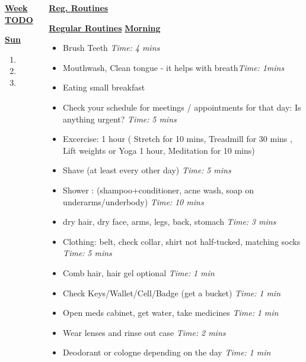 \documentclass[serif,mathserif,final]{beamer}
\newcommand{\timeEst}[1]{\textit{Time:} \textit{#1}}
\begin{document}
\begin{frame}{}
\begin{columns}[t]
\begin{column}{0.33\linewidth}{\textbf{\underline{Week TODO}}}
\begin{block}
\begin{enumerate}
\end{enumerate} 


\textbf{\underline{Sun}}

\begin{enumerate} 
\tiny \item \tiny 
\item \tiny 
\item \tiny 
\end{enumerate} 

\end{block} 

\end{column}%

\begin{column}{0.27\linewidth} {\textbf{\underline{Reg. Routines}}} 

\begin{block}{\small \textbf{\underline{Regular Routines}} }
\underline{\textbf{Morning}}
\begin{itemize}
\item \tiny Brush Teeth \timeEst{4 mins}
\item \tiny Mouthwash, Clean tongue - it helps with breath\timeEst{1mins} 
\item \tiny Eating small breakfast
\item \tiny Check your schedule for meetings / appointments for that day: Is anything urgent? \timeEst{5 mins}
\item \tiny Excercise: 1 hour ( Stretch for 10 mins, Treadmill for 30 mins , Lift weights or Yoga 1 hour, Meditation for 10 mins)
\item \tiny Shave (at least every other day) \timeEst{5 mins}
\item \tiny Shower : (shampoo+conditioner, acne wash,  soap on underarms/underbody)
\timeEst{10 mins}
\item \tiny dry hair, dry face, arms, legs, back, stomach \timeEst{3 mins}
\item \tiny Clothing: belt, check collar, shirt not half-tucked, matching socks \timeEst{5 mins}
\item \tiny Comb hair, hair gel optional \timeEst{ 1 min}
\item \tiny Check Keys/Wallet/Cell/Badge (get a bucket) \timeEst{1 min}
\item \tiny Open meds cabinet, get water, take medicines \timeEst{1 min}
\item \tiny Wear lenses and rinse out case \timeEst{ 2 mins}
\item \tiny Deodorant or cologne depending on the day \timeEst{1 min}

\end{itemize}
\end{block}
\end{column}
\end{columns}
\end{frame}
\end{document}
